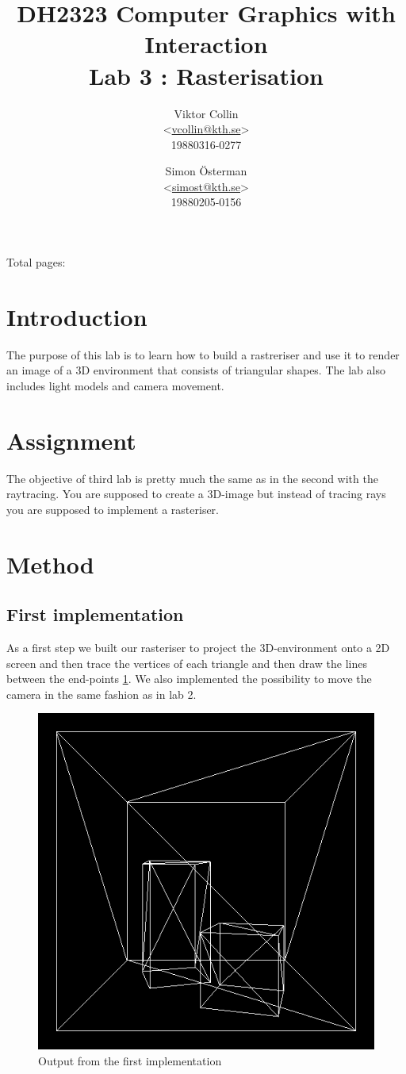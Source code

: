 \documentclass[a4paper,11pt]{article}
\author{Viktor Collin \\ <\url{vcollin@kth.se}> \\ 19880316-0277 \and Simon \"{O}sterman \\ <\url{simost@kth.se}> \\ 19880205-0156}
\title{\textbf{DH2323 Computer Graphics with Interaction \\ Lab 3 : Rasterisation}}
\begin{document}
\maketitle
\begin{center}
Total pages: \pageref{LastPage}
\end{center}
\thispagestyle{empty}

\clearpage
\setcounter{page}{1}
\section{Introduction}
The purpose of this lab is to learn how to build a rastreriser and use it to render an image of a 3D environment that consists of triangular shapes. The lab also includes light models and camera movement. 
\section{Assignment}
The objective of third lab is pretty much the same as in the second with the raytracing. You are supposed to create a 3D-image but instead of tracing rays you are supposed to implement a rasteriser.
\section{Method}
\subsection{First implementation}
As a first step we built our rasteriser to project the 3D-environment onto a 2D screen and then trace the vertices of each triangle and then draw the lines between the end-points \ref{fig1}. We also implemented the possibility to move the camera in the same fashion as in lab 2. 

\begin{figure}[h!]
	\centering	
	\includegraphics[width=0.45\linewidth]{screenshot1.png}
	\caption{Output from the first implementation}
	\label{fig1}
\end{figure}
\end{document}
